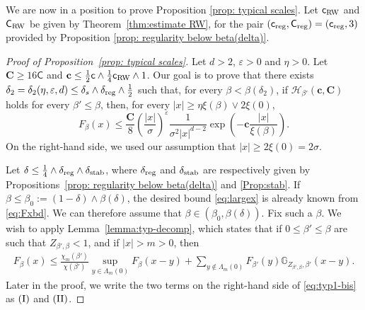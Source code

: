 \documentclass[11pt,a4paper]{article}
\numberwithin{equation}{section}
\theoremstyle{plain}
\theoremstyle{definition}
\newcommand\1{\mathds{1}}
\newcommand\bfc{\mathbf{c}}
\newcommand\bfC{\mathbf{C}}
\newcommand\Crw{\mathsf{C}_{\textup{RW}}}
\newcommand\crw{\mathsf{c}_{\textup{RW}}}
\newcommand\CGreen{\mathsf{C}}
\newcommand\cGreen{\mathsf{c}}
\newcommand\creg{\mathsf{c}_{\textup{reg}}}
\newcommand\Creg{\mathsf{C}_{\textup{reg}}}
\newcommand{\deltastab}{\delta_{\textup{stab}}}
\newcommand{\deltareg}{\delta_{\textup{reg}}}
\begin{document}
We are now in a position to prove Proposition \ref{prop: typical scales}. Let $\crw$ and $\Crw$ be given by Theorem~\ref{thm:estimate RW}, for the pair $(\creg,\Creg)=(\creg,3)$ provided by Proposition \ref{prop: regularity below beta(delta)}.

\begin{proof}[Proof of Proposition~\textup{\ref{prop: typical scales}}]
Let $d>2$, $\varepsilon>0$ and $\eta >0$.
Let $\bfC\ge 16\CGreen$ and
$\bfc \le \frac 12 \cGreen \wedge \frac{1}{4}\crw \wedge 1$.
Our goal is to prove that there exists $\delta_2=\delta_2(\eta,\varepsilon,d)\leq \delta_s\wedge \delta_{\textup{reg}}\wedge \tfrac{1}{2}$ such that, for every $\beta<\beta(\delta_2)$,
if $\mathcal H_{\beta'}(\bfc,\bfC)$ holds for every $\beta' \le \beta$,
then, for every $|x|\geq \eta \xi(\beta)\vee 2\xi(0)$,
\begin{equation}
\label{eq:largex}
	F_\beta(x)
    \leq
    \frac{\bfC}{8}
    \left(\frac{|x|}{\sigma}\right)^\varepsilon
    \frac{1}{\sigma^2 |x|^{d-2}}
    \exp\left(-\bfc \frac{|x|}{\xi(\beta)}\right).
\end{equation}
On the right-hand side, we used our assumption that
$|x|\ge2\xi(0)=2\sigma$.



Let $\delta \leq \tfrac14\wedge \deltareg\wedge\deltastab$, where $\deltareg$ and $\deltastab$ are respectively given by
Propositions~\ref{prop: regularity below beta(delta)} and \ref{Prop:stab}.
If $\beta\leq \beta_0:=(1-\delta)\wedge \beta(\delta)$, the
desired bound \eqref{eq:largex} is already known from \eqref{eq:Fxbd}.
We can therefore assume that $\beta\in(\beta_0,\beta(\delta))$.
Fix such a $\beta$.
We wish to apply Lemma~\ref{lemma:typ-decomp}, which states that
if $0 \le\beta' \le \beta$ are such that $Z_{\beta',\beta}<1$,
and if $|x| > m > 0$, then
\begin{align}
\label{eq:typ1-bis}
    F_\beta(x)
    \le
    \frac{\chi_m(\beta')}{\chi(\beta')} \sup_{y \in \Lambda_m(0)} F_\beta(x-y)
    +
    \sum_{y \notin \Lambda_{m}(0)} F_{\beta'}(y)\mathbb G_{Z_{\beta',\beta},\beta'}(x-y)
    .
\end{align}
Later in the proof, we write the two terms on the right-hand side of \eqref{eq:typ1-bis}
as $({\rm I})$ and $({\rm II})$.


\end{proof}
\end{document}

